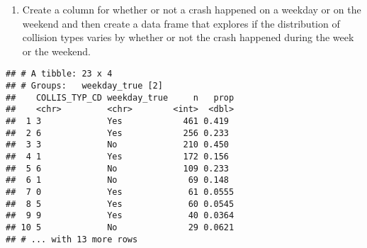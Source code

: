 \documentclass[]{article}
\newenvironment{Shaded}{\begin{snugshade}}{\end{snugshade}}
\newcommand{\KeywordTok}[1]{\textcolor[rgb]{0.13,0.29,0.53}{\textbf{#1}}}
\newcommand{\DataTypeTok}[1]{\textcolor[rgb]{0.13,0.29,0.53}{#1}}
\newcommand{\DecValTok}[1]{\textcolor[rgb]{0.00,0.00,0.81}{#1}}
\newcommand{\StringTok}[1]{\textcolor[rgb]{0.31,0.60,0.02}{#1}}
\newcommand{\OtherTok}[1]{\textcolor[rgb]{0.56,0.35,0.01}{#1}}
\newcommand{\OperatorTok}[1]{\textcolor[rgb]{0.81,0.36,0.00}{\textbf{#1}}}
\newcommand{\NormalTok}[1]{#1}
\providecommand{\tightlist}{%
  \setlength{\itemsep}{0pt}\setlength{\parskip}{0pt}}
\begin{document}
\begin{enumerate}
\def\labelenumi{\alph{enumi}.}
\setcounter{enumi}{2}
\tightlist
\item
  Create a column for whether or not a crash happened on a weekday or on
  the weekend and then create a data frame that explores if the
  distribution of collision types varies by whether or not the crash
  happened during the week or the weekend.
\end{enumerate}

\begin{Shaded}
\end{Shaded}

\begin{verbatim}
## # A tibble: 23 x 4
## # Groups:   weekday_true [2]
##    COLLIS_TYP_CD weekday_true     n   prop
##    <chr>         <chr>        <int>  <dbl>
##  1 3             Yes            461 0.419 
##  2 6             Yes            256 0.233 
##  3 3             No             210 0.450 
##  4 1             Yes            172 0.156 
##  5 6             No             109 0.233 
##  6 1             No              69 0.148 
##  7 0             Yes             61 0.0555
##  8 5             Yes             60 0.0545
##  9 9             Yes             40 0.0364
## 10 5             No              29 0.0621
## # ... with 13 more rows
\end{verbatim}
\end{document}
